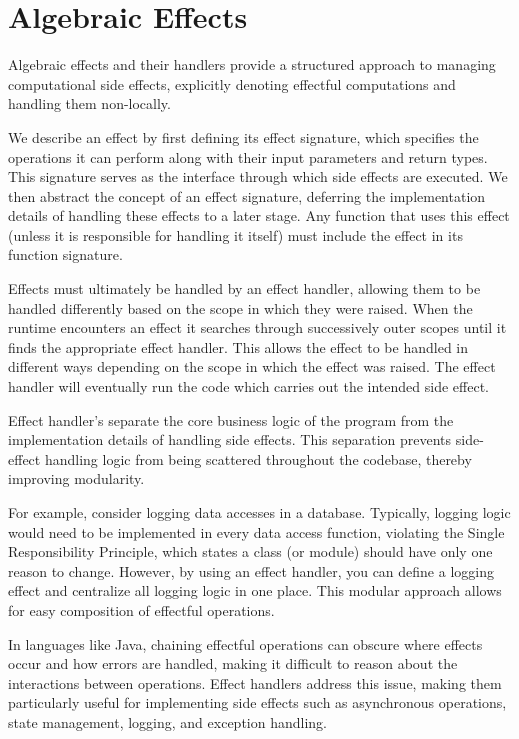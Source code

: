 \documentclass[logo,bsc,singlespacing,parskip]{infthesis}
\begin{document}
\section{Algebraic Effects}

Algebraic effects \cite{plotkin_handling_2013} and their handlers \cite{pretnar_introduction_2015} provide a structured approach to managing computational side effects, explicitly denoting effectful computations and handling them non-locally.

We describe an effect by first defining its effect signature, which specifies the operations it can perform along with their input parameters and return types. This signature serves as the interface through which side effects are executed. We then abstract the concept of an effect signature, deferring the implementation details of handling these effects to a later stage. Any function that uses this effect (unless it is responsible for handling it itself) must include the effect in its function signature. 

Effects must ultimately be handled by an effect handler, allowing them to be handled differently based on the scope in which they were raised. When the runtime encounters an effect it searches through successively outer scopes until it finds the appropriate effect handler. This allows the effect to be handled in different ways depending on the scope in which the effect was raised. The effect handler will eventually run the code which carries out the intended side effect. 

Effect handler’s separate the core business logic of the program from the implementation details of handling side effects. This separation prevents side-effect handling logic from being scattered throughout the codebase, thereby improving modularity. 

For example, consider logging data accesses in a database. Typically, logging logic would need to be implemented in every data access function, violating the Single Responsibility Principle, which states a class (or module) should have only one reason to change. However, by using an effect handler, you can define a logging effect and centralize all logging logic in one place. This modular approach allows for easy composition of effectful operations. 

In languages like Java, chaining effectful operations can obscure where effects occur and how errors are handled, making it difficult to reason about the interactions between operations. Effect handlers address this issue, making them particularly useful for implementing side effects such as asynchronous operations, state management, logging, and exception handling. 
\end{document}
